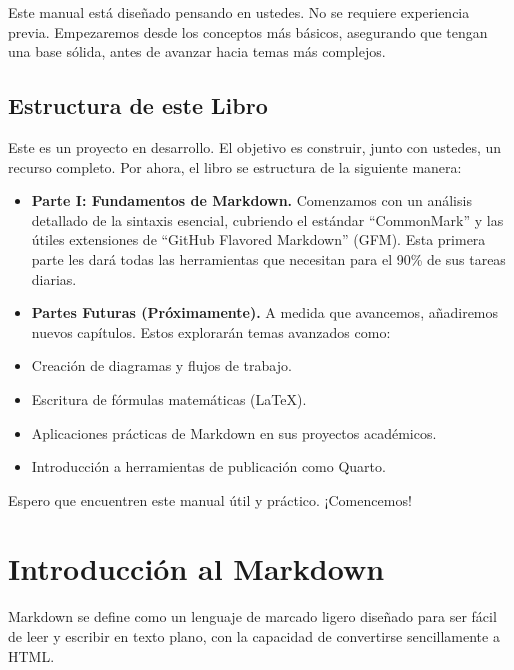\documentclass[
  letterpaper,
  DIV=11,
  numbers=noendperiod]{scrreprt}
\begin{document}

Este manual está diseñado pensando en ustedes. No se requiere
experiencia previa. Empezaremos desde los conceptos más básicos,
asegurando que tengan una base sólida, antes de avanzar hacia temas más
complejos.

\section*{Estructura de este Libro}\label{estructura-de-este-libro}


Este es un proyecto en desarrollo. El objetivo es construir, junto con
ustedes, un recurso completo. Por ahora, el libro se estructura de la
siguiente manera:

\begin{itemize}
\item
  \textbf{Parte I: Fundamentos de Markdown.} Comenzamos con un análisis
  detallado de la sintaxis esencial, cubriendo el estándar
  ``CommonMark'' y las útiles extensiones de ``GitHub Flavored
  Markdown'' (GFM). Esta primera parte les dará todas las herramientas
  que necesitan para el 90\% de sus tareas diarias.
\item
  \textbf{Partes Futuras (Próximamente).} A medida que avancemos,
  añadiremos nuevos capítulos. Estos explorarán temas avanzados como:
\item
  Creación de diagramas y flujos de trabajo.
\item
  Escritura de fórmulas matemáticas (LaTeX).
\item
  Aplicaciones prácticas de Markdown en sus proyectos académicos.
\item
  Introducción a herramientas de publicación como Quarto.
\end{itemize}

Espero que encuentren este manual útil y práctico. ¡Comencemos!


\chapter{Introducción al Markdown}\label{introducciuxf3n-al-markdown}

Markdown se define como un lenguaje de marcado ligero diseñado para ser
fácil de leer y escribir en texto plano, con la capacidad de convertirse
sencillamente a HTML.
\end{document}
